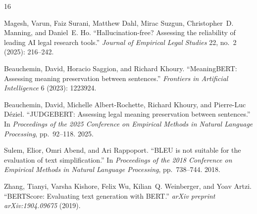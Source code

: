 
\begin{thebibliography}{16}
\providecommand{\natexlab}[1]{#1}

Magesh, Varun, Faiz Surani, Matthew Dahl, Mirac Suzgun, Christopher~D. Manning,
and Daniel~E. Ho. ``Hallucination-free? Assessing the reliability of leading AI
legal research tools.'' \emph{Journal of Empirical Legal Studies} 22, no.~2
(2025): 216--242.

Beauchemin, David, Horacio Saggion, and Richard Khoury. ``MeaningBERT:
Assessing meaning preservation between sentences.'' \emph{Frontiers in
Artificial Intelligence} 6 (2023): 1223924.

Beauchemin, David, Michelle Albert-Rochette, Richard Khoury, and Pierre-Luc
D{\'e}ziel. ``JUDGEBERT: Assessing legal meaning preservation between
sentences.'' In \emph{Proceedings of the 2025 Conference on Empirical Methods in
Natural Language Processing}, pp.~92--118. 2025.

Sulem, Elior, Omri Abend, and Ari Rappoport. ``BLEU is not suitable for the
evaluation of text simplification.'' In \emph{Proceedings of the 2018 Conference
on Empirical Methods in Natural Language Processing}, pp.~738--744. 2018.

Zhang, Tianyi, Varsha Kishore, Felix Wu, Kilian~Q. Weinberger, and Yoav Artzi.
``BERTScore: Evaluating text generation with BERT.'' \emph{arXiv preprint
arXiv:1904.09675} (2019).


\end{thebibliography}
